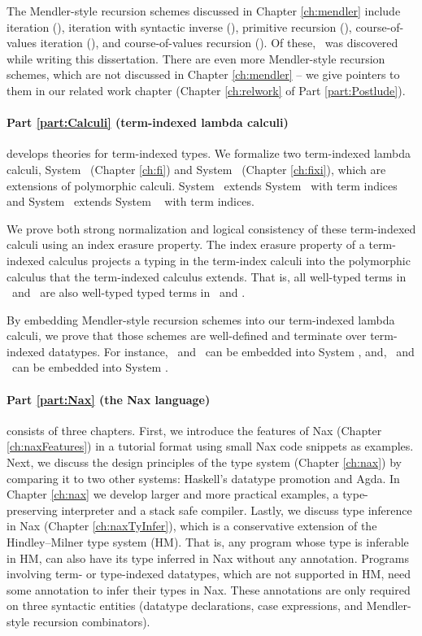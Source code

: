 The Mendler-style recursion schemes discussed in Chapter \ref{ch:mendler}
include iteration (\MIt), iteration with syntactic inverse (\MsfIt),
primitive recursion (\MPr), course-of-values iteration (\McvIt),
and course-of-values recursion (\McvPr). Of these, \MsfIt\ was discovered
while writing this dissertation.
There are even more Mendler-style recursion schemes, which are not
discussed in Chapter \ref{ch:mendler} -- we give pointers to them in our
related work chapter (Chapter \ref{ch:relwork} of Part \ref{part:Postlude}).

\paragraph{Part \ref{part:Calculi} (term-indexed lambda calculi)}\hspace{-1em}
develops theories for term-indexed types.
We formalize two term-indexed lambda calculi,
System \Fi\ (Chapter \ref{ch:fi}) and System \Fixi\ (Chapter \ref{ch:fixi}),
which are extensions of polymorphic calculi.
System \Fi\ extends System \Fw\ with term indices and
System \Fixi\ extends System \Fixw\ \cite{AbeMat04} with term indices.

We prove both strong normalization and logical consistency of
these term-indexed calculi using an index erasure property.
The index erasure property of a term-indexed calculus
projects a typing in the term-index calculi into
the polymorphic calculus that the term-indexed calculus extends.
That is, all well-typed terms in \Fi\ and \Fixi\ are
also well-typed typed terms in \Fw\ and \Fixw.


By embedding Mendler-style  recursion schemes into our term-indexed lambda calculi,
we prove that those schemes are well-defined and
terminate over term-indexed datatypes.  For instance,
\MIt\ and \MsfIt\ can be embedded into System \Fi,
and, \MPr\ and \McvPr\ can be embedded into System \Fixi.

\paragraph{Part \ref{part:Nax} (the Nax language)}\hspace{-1em} consists of
three chapters.
First, we introduce the features of Nax (Chapter \ref{ch:naxFeatures})
in a tutorial format using small Nax code snippets as examples.
Next, we discuss the design principles of the type system (Chapter \ref{ch:nax})
by comparing it to two other systems: Haskell's datatype promotion and Agda.
In Chapter \ref{ch:nax} we develop
larger and more practical examples,
a type-preserving interpreter and a stack safe compiler.
Lastly, we discuss type inference in Nax (Chapter \ref{ch:naxTyInfer}),
which is a conservative extension of the Hindley--Milner type system (HM).
That is, any program whose type is inferable in HM, can also have its type
inferred in Nax without any annotation. Programs involving
term- or type-indexed datatypes, which are not supported in HM, need
some annotation to infer their types in Nax. These annotations are only
required on three syntactic entities (datatype declarations, case expressions,
and Mendler-style recursion combinators).

